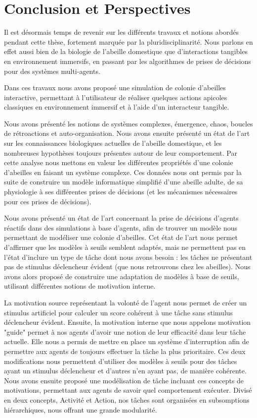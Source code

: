 \chapter*{Conclusion et Perspectives}

Il est désormais temps de revenir sur les différents travaux et notions abordés pendant cette thèse, fortement marquée par la pluridisciplinarité. Nous parlons en effet aussi bien de la biologie de l'abeille domestique que d'interactions tangibles en environnement immersifs, en passant par les algorithmes de prises de décisions pour des systèmes multi-agents.

Dans ces travaux nous avons proposé une simulation de colonie d'abeilles interactive, permettant à l'utilisateur de réaliser quelques actions apicoles classiques en environnement immersif et à l'aide d'un interacteur tangible.

Nous avons présenté les notions de systèmes complexes, émergence, chaos, boucles de rétroactions et auto-organisation. Nous avons ensuite présenté un état de l'art sur les connaissances biologiques actuelles de l'abeille domestique, et les nombreuses hypothèses toujours présentes autour de leur comportement. Par cette analyse nous mettons en valeur les différentes propriétés d'une colonie d'abeilles en faisant un système complexe. Ces données nous ont permis par la suite de construire un modèle informatique simplifié d'une abeille adulte, de sa physiologie à ses différentes prises de décisions (et les mécanismes nécessaires pour ces prises de décisions).

Nous avons présenté un état de l'art concernant la prise de décisions d'agents réactifs dans des simulations à base d'agents, afin de trouver un modèle nous permettant de modéliser une colonie d'abeilles. Cet état de l'art nous permet d'affirmer que les modèles à seuils semblent adaptés, mais ne permettent pas en l'état d'inclure un type de tâche dont nous avons besoin : les tâches ne présentant pas de stimulus déclencheur évident (que nous retrouvons chez les abeilles). Nous avons alors proposé de construire une adaptation de modèles à base de seuils, utilisant différentes notions de motivation interne.

La motivation source représentant la volonté de l'agent nous permet de créer un stimulus artificiel pour calculer un score cohérent à une tâche sans stimulus déclencheur évident. Ensuite, la motivation interne que nous appelons motivation "guide" permet à nos agents d'avoir une notion de leur efficacité dans leur tâche actuelle. Elle nous a permis de mettre en place un système d'interruption afin de permettre aux agents de toujours effectuer la tâche la plus prioritaire. Ces deux modifications nous permettent d'utiliser des modèles à seuils pour des tâches ayant un stimulus déclencheur et d'autres n'en ayant pas, de manière cohérente. Nous avons ensuite proposé une modélisation de tâche incluant ces concepts de motivations, permettant aux agents de savoir quel comportement exécuter. Divisé en deux concepts, Activité et Action, nos tâches sont organisées en subsomptions hiérarchiques, nous offrant une grande modularité.

